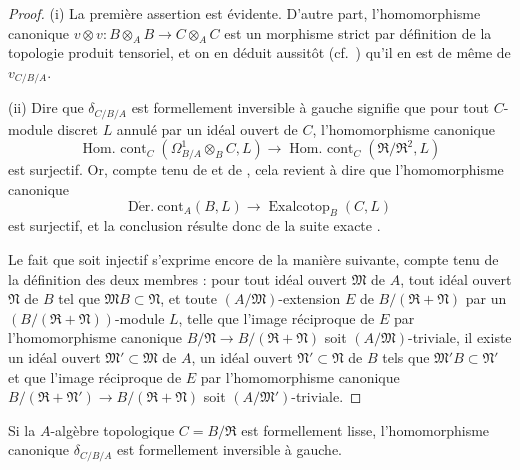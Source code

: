 \begin{proof}
(i) La première assertion est évidente. D'autre part, l'homomorphisme
canonique $v\otimes v:B\otimes_A B\to C\otimes_A C$ est un morphisme strict
par définition de la topologie produit tensoriel, et on en déduit aussitôt
(cf.\ ) qu'il en est de même de $v_{C/B/A}$.

(ii) Dire que $\delta_{C/B/A}$ est formellement inversible à gauche signifie
que pour tout $C$-module discret $L$ annulé par un idéal ouvert de $C$,
l'homomorphisme canonique
\[
  \operatorname{Hom.\ cont}_C(\Omega^1_{B/A}\otimes_B C,L)\to
  \operatorname{Hom.\ cont}_C(\mathfrak{R}/\mathfrak{R}^2,L)
\]
est surjectif. Or, compte tenu de  et de
, cela revient à dire que l'homomorphisme canonique
\[
  \operatorname{D\acute{e}r.\ cont}_A(B,L)\to
  \operatorname{Exalcotop}_B(C,L)
\]
est surjectif, et la conclusion résulte donc de la suite exacte
.

Le fait que  soit injectif s'exprime encore de la manière
suivante, compte tenu de la définition des deux membres
 : pour tout idéal ouvert $\mathfrak{M}$ de $A$, tout idéal
ouvert $\mathfrak{N}$ de $B$ tel que $\mathfrak{M}B\subset\mathfrak{N}$, et
toute $(A/\mathfrak{M})$-extension $E$ de
$B/(\mathfrak{R}+\mathfrak{N})$ par un
$(B/(\mathfrak{R}+\mathfrak{N}))$-module $L$, telle que l'image réciproque de
$E$ par l'homomorphisme canonique
$B/\mathfrak{N}\to B/(\mathfrak{R}+\mathfrak{N})$ soit
$(A/\mathfrak{M})$-triviale, il existe un idéal ouvert
$\mathfrak{M}'\subset\mathfrak{M}$ de $A$,
un idéal ouvert $\mathfrak{N}'\subset\mathfrak{N}$ de $B$ tels que
$\mathfrak{M}'B\subset\mathfrak{N}'$ et que l'image réciproque de $E$ par
l'homomorphisme canonique
$B/(\mathfrak{R}+\mathfrak{N}')\to B/(\mathfrak{R}+\mathfrak{N})$ soit
$(A/\mathfrak{M}')$-triviale.
\end{proof}

\begin{corollary}[20.7.9]
\label{0.20.7.9-fr}
Si la $A$-algèbre topologique $C=B/\mathfrak{R}$ est formellement lisse,
l'homomorphisme canonique $\delta_{C/B/A}$ est formellement inversible à
gauche.
\end{corollary}

